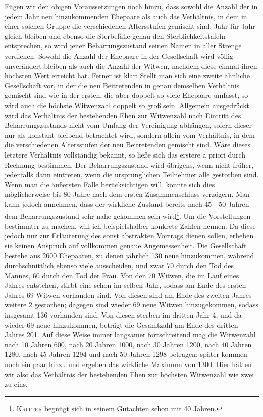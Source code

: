 Fügen wir den obigen Voraussetzungen noch hinzu, dass sowohl die Anzahl der in jedem Jahr
neu hinzukommenden Ehepaare als auch das Verhältnis, in dem in einer solchen Gruppe die verschiedenen Altersstufen gemischt sind, Jahr für Jahr gleich bleiben und ebenso die Sterbefälle genau den Sterblichkeitstafeln entsprechen, so wird jener Beharrungszustand seinen Namen in aller Strenge verdienen. Sowohl die Anzahl der Ehepaare in der Gesellschaft wird völlig unverändert bleiben als auch die Anzahl der Witwen, nachdem diese einmal ihren höchsten Wert erreicht hat. Ferner ist klar: Stellt man sich eine zweite ähnliche Gesellschaft vor, in der die neu Beitretenden in genau demselben Verhältnis gemischt sind wie in der ersten, die aber doppelt so viele Ehepaare umfasst, so wird auch die höchste Witwenzahl doppelt so groß sein. Allgemein ausgedrückt wird das Verhältnis der bestehenden Ehen zur Witwenzahl nach Eintritt des Beharrungszustands nicht vom Umfang der Vereinigung abhängen, sofern dieser nur als konstant bleibend betrachtet wird, sondern allein vom Verhältnis, in dem die verschiedenen Altersstufen der neu Beitretenden gemischt sind. Wäre dieses letztere Verhältnis vollständig bekannt, so ließe sich das erstere a priori durch Rechnung bestimmen. Der Beharrungszustand wird übrigens, wenn nicht früher, jedenfalls dann eintreten, wenn die ursprünglichen Teilnehmer alle gestorben sind. Wenn man die äußersten Fälle berücksichtigen will, könnte sich dies möglicherweise bis 80 Jahre nach dem ersten Zusammenschluss verzögern. Man kann jedoch annehmen, dass der wirkliche Zustand bereits nach 45—50 Jahren dem Beharrungszustand sehr nahe gekommen sein wird\footnote{\textsc{Kritter} begnügt sich in seinem Gutachten schon mit 40 Jahren.}. Um die Vorstellungen bestimmter zu machen, will ich beispielshalber konkrete Zahlen nennen. Da diese jedoch nur zur Erläuterung des sonst abstrakten Vortrags dienen sollen, erheben sie keinen Anspruch auf vollkommen genaue Angemessenheit. Die Gesellschaft bestehe aus 2600 Ehepaaren, zu denen jährlich 130 neue hinzukommen, während durchschnittlich ebenso viele ausscheiden, und zwar 70 durch den Tod des Mannes, 60 durch den Tod der Frau. Von den 70 Witwen, die im Lauf eines Jahres entstehen, stirbt eine schon im selben Jahr, sodass am Ende des ersten Jahres 69 Witwen vorhanden sind. Von diesen sind am Ende des zweiten Jahres weitere 2 gestorben; dagegen sind wieder 69 neue Witwen hinzugekommen, sodass insgesamt 136 vorhanden sind. Von diesen sterben im dritten Jahr 4, und da wieder 69 neue hinzukommen, beträgt die Gesamtzahl am Ende des dritten Jahres 201. Auf diese Weise immer langsamer fortschreitend mag die Witwenzahl nach 10 Jahren 600, nach 20 Jahren 1000, nach 30 Jahren 1200, nach 40 Jahren 1280, nach 45 Jahren 1294 und nach 50 Jahren 1298 betragen; später kommen noch ein paar hinzu und ergeben das wirkliche Maximum von 1300. Hier hätten wir also das Verhältnis der bestehenden Ehen zur höchsten Witwenzahl wie zwei zu eins.

